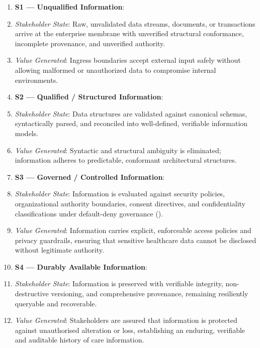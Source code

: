 \begin{enumerate}


\item \textbf{S1 — Unqualified Information}:

\item \emph{Stakeholder State}: Raw, unvalidated data streams, documents, or transactions arrive at the enterprise membrane with unverified structural conformance, incomplete provenance, and unverified authority.

\item \emph{Value Generated}: Ingress boundaries accept external input safely without allowing malformed or unauthorized data to compromise internal environments.

\item \textbf{S2 — Qualified / Structured Information}:

\item \emph{Stakeholder State}: Data structures are validated against canonical schemas, syntactically parsed, and reconciled into well-defined, verifiable information models.

\item \emph{Value Generated}: Syntactic and structural ambiguity is eliminated; information adheres to predictable, conformant architectural structures.

\item \textbf{S3 — Governed / Controlled Information}:

\item \emph{Stakeholder State}: Information is evaluated against security policies, organizational authority boundaries, consent directives, and confidentiality classifications under default-deny governance (\texttt{}).

\item \emph{Value Generated}: Information carries explicit, enforceable access policies and privacy guardrails, ensuring that sensitive healthcare data cannot be disclosed without legitimate authority.

\item \textbf{S4 — Durably Available Information}:

\item \emph{Stakeholder State}: Information is preserved with verifiable integrity, non-destructive versioning, and comprehensive provenance, remaining resiliently queryable and recoverable.

\item \emph{Value Generated}: Stakeholders are assured that information is protected against unauthorised alteration or loss, establishing an enduring, verifiable and auditable history of care information.


\end{enumerate}
